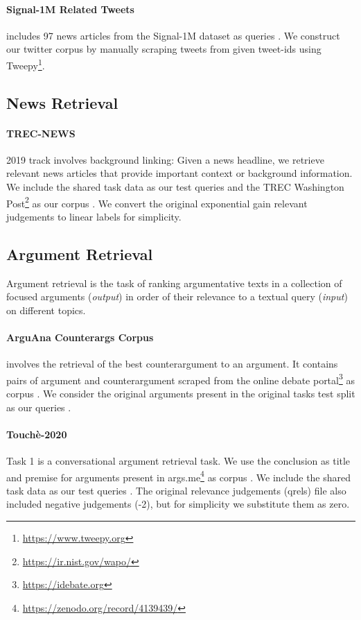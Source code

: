 \documentclass[11pt]{article}
\begin{document}
\paragraph{Signal-1M Related Tweets} \cite{Signal1MRelatedTweetsRetrieval2018} includes 97 news articles from the Signal-1M dataset \cite{Signal1M2016} as queries . We construct our twitter corpus  by manually scraping tweets from given tweet-ids using Tweepy\footnote{\href{https://www.tweepy.org}{https://www.tweepy.org}}.

\subsection{News Retrieval}

\paragraph{TREC-NEWS} \cite{soboroff2019trec} 2019 track involves background linking: Given a news headline, we retrieve relevant news articles that provide important context or background information. We include the shared task data as our test queries  and the TREC Washington Post\footnote{\href{https://ir.nist.gov/wapo/}{https://ir.nist.gov/wapo/}} as our corpus . We convert the original exponential gain relevant judgements to linear labels for simplicity. 

\subsection{Argument Retrieval}
Argument retrieval is the task of ranking argumentative texts in a collection of focused arguments (\textit{output}) in order of their relevance to a textual query (\textit{input}) on different topics.

\paragraph{ArguAna Counterargs Corpus} \cite{wachsmuth:2018a} involves the retrieval of the best counterargument to an argument. It contains pairs of argument and counterargument scraped from the online debate portal\footnote{\href{https://idebate.org)}{https://idebate.org}} as corpus . We consider the original arguments present in the original tasks test split as our queries .

\paragraph{Touch\`e-2020} \cite{stein:2020v} Task 1 is a conversational argument retrieval task. We use the conclusion as title and premise for arguments present in args.me\footnote{\href{https://zenodo.org/record/4139439/}{https://zenodo.org/record/4139439/}} \cite{stein:2017r} as corpus . We include the shared task data as our test queries . The original relevance judgements (qrels) file also included negative judgements (-2), but for simplicity we substitute them as zero.  
\end{document}
